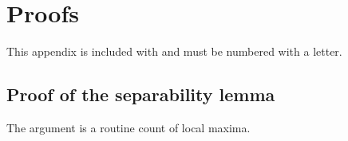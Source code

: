 \section{Proofs}
\label{app:proofs}
This appendix is included with \verb|| and must be numbered with a letter.

\subsection{Proof of the separability lemma}
The argument is a routine count of local maxima.
